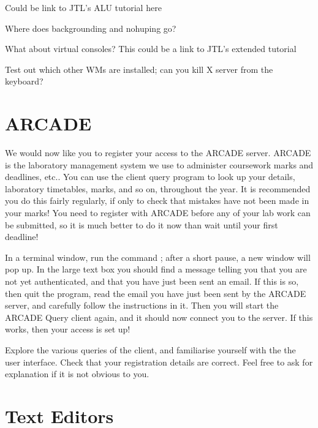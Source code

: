 \begin{note}
Could be link to JTL's ALU tutorial here
\end{note}


\begin{note}
Where does backgrounding and nohuping go?
\end{note}

\begin{note}
What about virtual consoles? This could be a link to JTL's extended tutorial
\end{note}

\begin{note}
Test out which other WMs are installed; can you kill X server from the keyboard?
\end{note}



\section{ARCADE}

We would now like you to register your access to the ARCADE server. ARCADE is the laboratory management system we use to administer coursework marks and deadlines, etc.. You can use the client query program to look up your details, laboratory timetables, marks, and so on, throughout the year. It is recommended you do this fairly regularly, if only to check that mistakes have not been made in your marks! You need to register with ARCADE before any of your lab work can be submitted, so it is much better to do it now than wait until your first deadline!

In a terminal window, run the command ; after a short pause, a new window will pop up. In the large text box you should find a message telling you that you are not yet authenticated, and that you have just been sent an email. If this is so, then quit the program, read the email you have just been sent by the ARCADE server, and carefully follow the instructions in it. Then you will start the ARCADE Query client again, and it should now connect you to the server. If this works, then your access is set up!

Explore the various queries of the client, and familiarise yourself with the the user interface. Check that your registration details are correct. Feel free to ask for explanation if it is not obvious to you.

\section{Text Editors}

